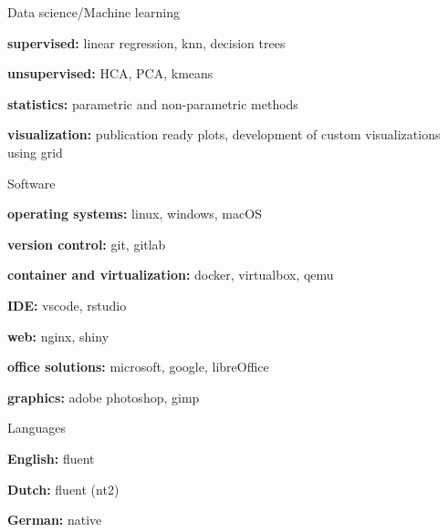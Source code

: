 \begin{cvskills}
  \cvskill
    {Data science/Machine learning}%
    {
      \begin{cvitems}
        \item {\textbf{supervised:} linear regression, knn, decision trees}
        \item {\textbf{unsupervised:} HCA, PCA, kmeans}
        \item {\textbf{statistics:} parametric and non-parametric methods}
        \item {\textbf{visualization:} publication ready plots, development of custom visualizations using grid}
      \end{cvitems}
    }
  \cvskill
    {Software}%
    {
      \begin{cvitems}
        \item {\textbf{operating systems:} linux, windows, macOS}
        \item {\textbf{version control:} git, gitlab}
        \item {\textbf{container and virtualization:} docker, virtualbox, qemu}
        \item {\textbf{IDE:} vscode, rstudio}
        \item {\textbf{web:} nginx, shiny}
        \item {\textbf{office solutions:} microsoft, google, libreOffice}
        \item {\textbf{graphics:} adobe photoshop, gimp}
      \end{cvitems}
    }
  \cvskill
    {Languages} %
    {
      \begin{cvitems}
        \item {\textbf{English:} fluent}
        \item {\textbf{Dutch:} fluent (nt2)}
        \item {\textbf{German:} native}
      \end{cvitems}
    }
\end{cvskills}
